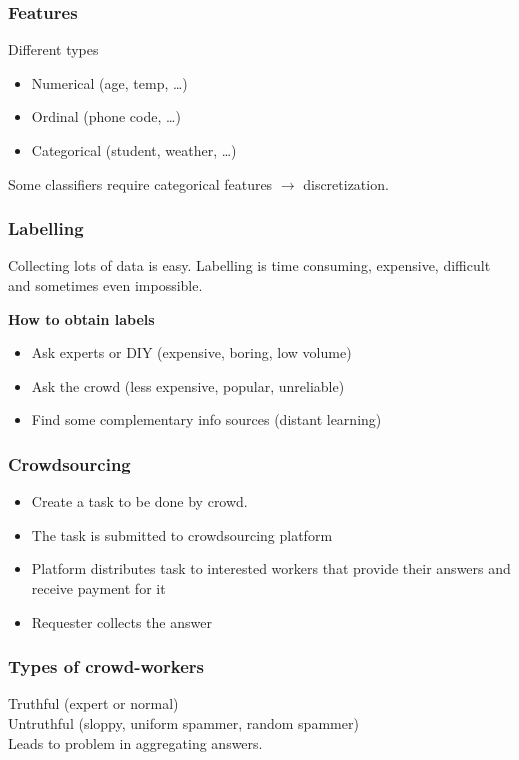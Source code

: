 \subsubsection{Features}
Different types
\begin{itemize}
\item Numerical (age, temp, \ldots)
\item Ordinal (phone code, \ldots)
\item Categorical (student, weather, \ldots)
\end{itemize}

Some classifiers require categorical features $ \rightarrow $
discretization.

\subsubsection{Labelling}
Collecting lots of data is easy. Labelling is time consuming,
expensive, difficult and sometimes even impossible.

\textbf{How to obtain labels}
\begin{itemize}
\item Ask experts or DIY (expensive, boring, low volume)
\item Ask the crowd (less expensive, popular, unreliable)
\item Find some complementary info sources (distant learning)
\end{itemize}

\subsubsection{Crowdsourcing}
\begin{itemize}
\item Create a task to be done by crowd.
\item The task is submitted to crowdsourcing platform
\item Platform distributes task to interested workers that provide
  their answers and receive payment for it
\item Requester collects the answer
\end{itemize}

\subsubsection{Types of crowd-workers}
Truthful (expert or normal) \\
Untruthful (sloppy, uniform spammer, random spammer) \\
Leads to problem in aggregating answers.

